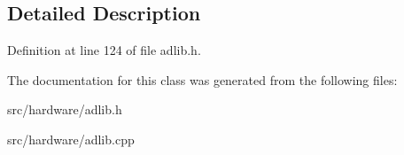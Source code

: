 \subsection{Detailed Description}


Definition at line 124 of file adlib.\-h.



The documentation for this class was generated from the following files\-:\begin{DoxyCompactItemize}
\item 
src/hardware/adlib.\-h\item 
src/hardware/adlib.\-cpp\end{DoxyCompactItemize}
